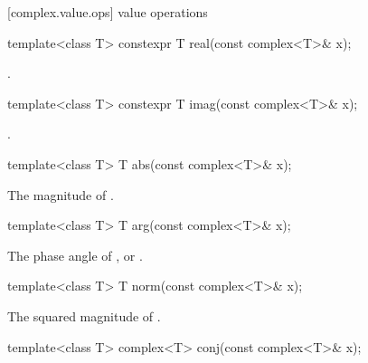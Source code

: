 [complex.value.ops]{ value operations}

%
\begin{itemdecl}
template<class T> constexpr T real(const complex<T>& x);
\end{itemdecl}

\begin{itemdescr}
\pnum
\returns
{}.
\end{itemdescr}

%
\begin{itemdecl}
template<class T> constexpr T imag(const complex<T>& x);
\end{itemdecl}

\begin{itemdescr}
\pnum
\returns
{}.
\end{itemdescr}

%
\begin{itemdecl}
template<class T> T abs(const complex<T>& x);
\end{itemdecl}

\begin{itemdescr}
\pnum
\returns
The magnitude of .
\end{itemdescr}

%
\begin{itemdecl}
template<class T> T arg(const complex<T>& x);
\end{itemdecl}

\begin{itemdescr}
\pnum
\returns
The phase angle of , or .
\end{itemdescr}

%
\begin{itemdecl}
template<class T> T norm(const complex<T>& x);
\end{itemdecl}

\begin{itemdescr}
\pnum
\returns
The squared magnitude of .
\end{itemdescr}

%
\begin{itemdecl}
template<class T> complex<T> conj(const complex<T>& x);
\end{itemdecl}

